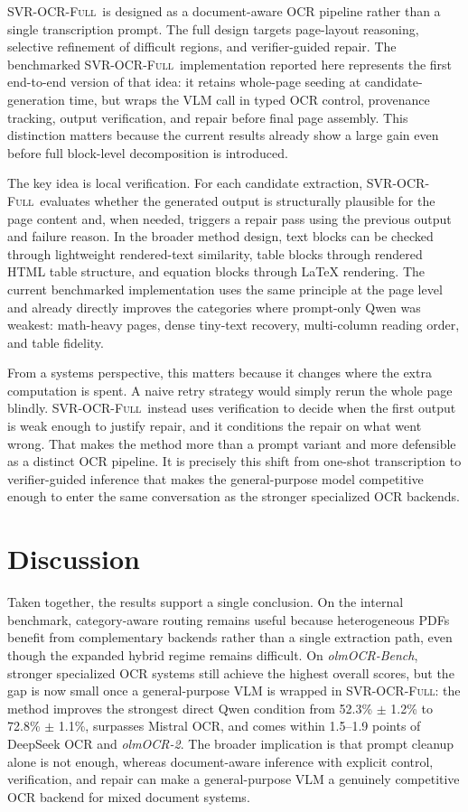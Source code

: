 \documentclass[conference]{IEEEtran}
\newcommand{\papername}[1]{\textit{#1}}
\newcommand{\svrocr}{\textsc{SVR-OCR-Full}}
\newcommand{\olmocr}{\papername{olmOCR-2}}
\begin{document}
\svrocr\ is designed as a document-aware OCR pipeline rather than a single transcription prompt. The full design targets page-layout reasoning, selective refinement of difficult regions, and verifier-guided repair. The benchmarked \svrocr\ implementation reported here represents the first end-to-end version of that idea: it retains whole-page seeding at candidate-generation time, but wraps the VLM call in typed OCR control, provenance tracking, output verification, and repair before final page assembly. This distinction matters because the current results already show a large gain even before full block-level decomposition is introduced.

The key idea is local verification. For each candidate extraction, \svrocr\ evaluates whether the generated output is structurally plausible for the page content and, when needed, triggers a repair pass using the previous output and failure reason. In the broader method design, text blocks can be checked through lightweight rendered-text similarity, table blocks through rendered HTML table structure, and equation blocks through LaTeX rendering. The current benchmarked implementation uses the same principle at the page level and already directly improves the categories where prompt-only Qwen was weakest: math-heavy pages, dense tiny-text recovery, multi-column reading order, and table fidelity.

From a systems perspective, this matters because it changes where the extra computation is spent. A naive retry strategy would simply rerun the whole page blindly. \svrocr\ instead uses verification to decide when the first output is weak enough to justify repair, and it conditions the repair on what went wrong. That makes the method more than a prompt variant and more defensible as a distinct OCR pipeline. It is precisely this shift from one-shot transcription to verifier-guided inference that makes the general-purpose model competitive enough to enter the same conversation as the stronger specialized OCR backends.

\section{Discussion}

Taken together, the results support a single conclusion. On the internal benchmark, category-aware routing remains useful because heterogeneous PDFs benefit from complementary backends rather than a single extraction path, even though the expanded hybrid regime remains difficult. On \papername{olmOCR-Bench}, stronger specialized OCR systems still achieve the highest overall scores, but the gap is now small once a general-purpose VLM is wrapped in \svrocr: the method improves the strongest direct Qwen condition from 52.3\% $\pm$ 1.2\% to 72.8\% $\pm$ 1.1\%, surpasses Mistral OCR, and comes within 1.5--1.9 points of DeepSeek OCR and \olmocr. The broader implication is that prompt cleanup alone is not enough, whereas document-aware inference with explicit control, verification, and repair can make a general-purpose VLM a genuinely competitive OCR backend for mixed document systems.
\end{document}
